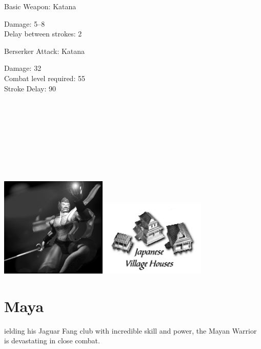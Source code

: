 Basic Weapon: Katana
\begin{adjustwidth}{1cm}{}
	Damage: 5–8 \\
	Delay between strokes: 2
\end{adjustwidth}
Berserker Attack: Katana
\begin{adjustwidth}{1cm}{}
	Damage: 32 \\
	Combat level required: 55 \\
	Stroke Delay: 90 \\ \\ \\ \\ \\ \\ \\ \\ \\
\end{adjustwidth}

\begin{center}
	\includegraphics[width=2in]{Amindturner}\hspace{1pt}\includegraphics[width=2in]{Ijapanesehouse}
\end{center}

\clearpage

\section{Maya}


ielding his Jaguar Fang club with incredible skill and power, the Mayan Warrior is devastating in close combat.

